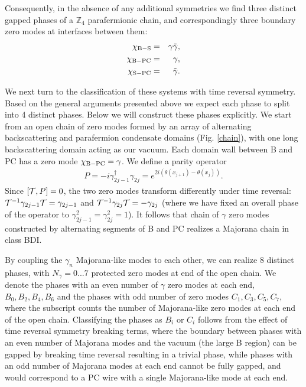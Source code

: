 \documentclass[twocolumn,aps,prb,showpacs]{revtex4-1}
\begin{document}
Consequently, in the absence of any additional symmetries we find three  distinct gapped phases of a $ \mathbb{Z}_4$ parafermionic chain, and correspondingly  three boundary  zero modes at interfaces between them:
\begin{eqnarray}
\nonumber
\chi_{\rm B-S}&=&\gamma \tilde{\gamma}, \\
\nonumber
\chi_{\rm B-PC} &=&\gamma, \\
\chi_{\rm S-PC} &=&\tilde{\gamma}.
\end{eqnarray}


We next turn to the classification of these systems with time reversal symmetry.
Based on the general  arguments presented above we expect each phase to split into 4 distinct phases. Below we will construct these phases explicitly. We start from  an open chain of zero modes formed  by an array of  alternating  backscattering and parafermion condensate  domains (Fig. \ref{chain}), with one long backscattering domain acting as our vacuum. Each domain wall between B and PC has a zero mode $\chi_{\rm B-PC}=\gamma$.
We define a parity operator
\begin{eqnarray}
P = -i\gamma_{2j-1}^\dag\gamma_{2j}= e^{2i(\theta(x_{j+1})-\theta(x_{j}))}.
\end{eqnarray}
Since $ [{\cal T},P]=0$, the two zero modes transform differently under time reversal: ${\cal T}^{-1} \gamma_{2j-1}{\cal T}=\gamma_{2j-1} $ and ${\cal T}^{-1} \gamma_{2j}{\cal T}=-\gamma_{2j} $ (where we have fixed an overall phase of the operator to $ \gamma_{2j-1}^2 =\gamma_{2j}^2 =1$).
It follows that chain of $\gamma$ zero modes constructed by alternating segments of B and PC realizes a  Majorana chain in class BDI.

 By coupling the $\gamma_n$  Majorana-like modes to each other, we can realize 8 distinct phases, with $N_\gamma = 0...7$ protected zero modes at end of the open chain. We denote the phases with an even number of $\gamma $ zero modes at each end, $B_0,B_2,B_4,B_6 $ and the phases with odd number of zero modes $C_1,C_3,C_5,C_7 $,  where the subscript counts the number of Majorana-like zero modes at each end of the open chain.
Classifying the phases as $ B_i$ or $ C_i$ follows from the effect of time reversal symmetry breaking terms,  where the boundary between phases with an even number of Majorana modes and the vacuum (the large B region) can be gapped by breaking time reversal resulting in a trivial phase, while phases with an odd number of Majorana modes at each end cannot be fully gapped, and would correspond to a PC  wire  with a single Majorana-like mode at each end.
\end{document}
